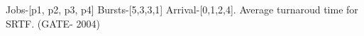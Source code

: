 

\begin{minipage}{\linewidth}

  \question  Jobs-[p1, p2, p3, p4] Bursts-[5,3,3,1] Arrival-[0,1,2,4]. Average turnaroud time for SRTF. (GATE- 2004)

  \begin{oneparchoices}
  \end{oneparchoices}

\end{minipage}



\begin{comment}

\begin{minipage}{\linewidth}

  \question  (GATE- )

  \begin{choices}
    \choice
    \choice
    \choice
    \choice
  \end{choices}

\end{minipage}


\end{comment}
